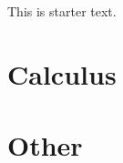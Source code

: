 \documentclass{article}
\begin{document}
This is starter text.

 
\section{Calculus}
 

\section{Other}

\end{document}
